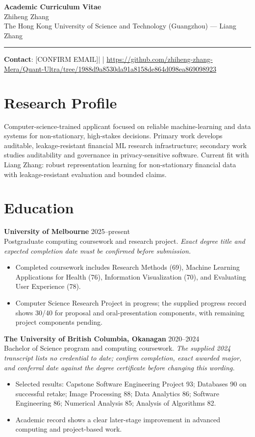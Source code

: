 \documentclass[11pt]{article}
\newcommand{\ApplicantName}{Zhiheng Zhang}
\newcommand{\ApplicantEmail}{[CONFIRM EMAIL]}
\newcommand{\ApplicantPhone}{[CONFIRM PHONE]}
\newcommand{\ApplicantGitHub}{\url{https://github.com/zhiheng-zhang-Mera/Quant-Ultra/tree/1988d9a8530da91a8158de864d098ea869098923}}
\begin{document}
\begin{center}
{\LARGE\bfseries Academic Curriculum Vitae}\\[0.25em]
{\large \ApplicantName}\\
The Hong Kong University of Science and Technology (Guangzhou) --- Liang Zhang
\end{center}
\vspace{0.35em}\hrule\vspace{0.65em}

\textbf{Contact}: \ApplicantEmail\quad | \quad \ApplicantPhone\quad | \quad \ApplicantGitHub

\section*{Research Profile}
Computer-science-trained applicant focused on reliable machine-learning and data systems for non-stationary, high-stakes decisions. Primary work develops auditable, leakage-resistant financial ML research infrastructure; secondary work studies auditability and governance in privacy-sensitive software. Current fit with Liang Zhang: robust representation learning for non-stationary financial data with leakage-resistant evaluation and bounded claims.

\section*{Education}
\textbf{University of Melbourne} \hfill 2025--present\\
Postgraduate computing coursework and research project. \textit{Exact degree title and expected completion date must be confirmed before submission.}
\begin{itemize}
\item Completed coursework includes Research Methods (69), Machine Learning Applications for Health (76), Information Visualization (70), and Evaluating User Experience (78).
\item Computer Science Research Project in progress; the supplied progress record shows 30/40 for proposal and oral-presentation components, with remaining project components pending.
\end{itemize}

\textbf{The University of British Columbia, Okanagan} \hfill 2020--2024\\
Bachelor of Science program and computing coursework. \textit{The supplied 2024 transcript lists no credential to date; confirm completion, exact awarded major, and conferral date against the degree certificate before changing this wording.}
\begin{itemize}
\item Selected results: Capstone Software Engineering Project 93; Databases 90 on successful retake; Image Processing 88; Data Analytics 86; Software Engineering 86; Numerical Analysis 85; Analysis of Algorithms 82.
\item Academic record shows a clear later-stage improvement in advanced computing and project-based work.
\end{itemize}
\end{document}
